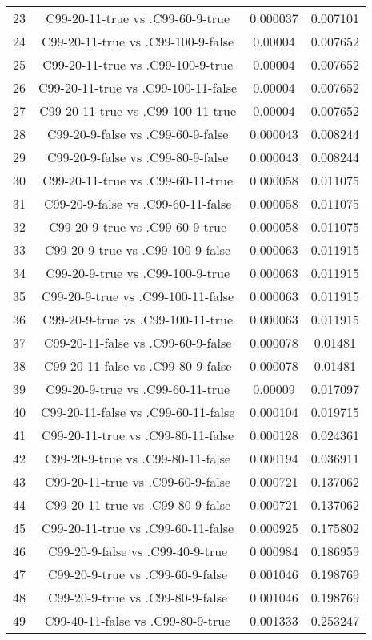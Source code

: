 \documentclass[a4paper,10pt]{article}
\begin{document}
\begin{landscape}
\begin{table}[!htp]
\begin{tabular}{cccc}
23&C99-20-11-true vs .C99-60-9-true&0.000037&0.007101\\
24&C99-20-11-true vs .C99-100-9-false&0.00004&0.007652\\
25&C99-20-11-true vs .C99-100-9-true&0.00004&0.007652\\
26&C99-20-11-true vs .C99-100-11-false&0.00004&0.007652\\
27&C99-20-11-true vs .C99-100-11-true&0.00004&0.007652\\
28&C99-20-9-false vs .C99-60-9-false&0.000043&0.008244\\
29&C99-20-9-false vs .C99-80-9-false&0.000043&0.008244\\
30&C99-20-11-true vs .C99-60-11-true&0.000058&0.011075\\
31&C99-20-9-false vs .C99-60-11-false&0.000058&0.011075\\
32&C99-20-9-true vs .C99-60-9-true&0.000058&0.011075\\
33&C99-20-9-true vs .C99-100-9-false&0.000063&0.011915\\
34&C99-20-9-true vs .C99-100-9-true&0.000063&0.011915\\
35&C99-20-9-true vs .C99-100-11-false&0.000063&0.011915\\
36&C99-20-9-true vs .C99-100-11-true&0.000063&0.011915\\
37&C99-20-11-false vs .C99-60-9-false&0.000078&0.01481\\
38&C99-20-11-false vs .C99-80-9-false&0.000078&0.01481\\
39&C99-20-9-true vs .C99-60-11-true&0.00009&0.017097\\
40&C99-20-11-false vs .C99-60-11-false&0.000104&0.019715\\
41&C99-20-11-true vs .C99-80-11-false&0.000128&0.024361\\
42&C99-20-9-true vs .C99-80-11-false&0.000194&0.036911\\
43&C99-20-11-true vs .C99-60-9-false&0.000721&0.137062\\
44&C99-20-11-true vs .C99-80-9-false&0.000721&0.137062\\
45&C99-20-11-true vs .C99-60-11-false&0.000925&0.175802\\
46&C99-20-9-false vs .C99-40-9-true&0.000984&0.186959\\
47&C99-20-9-true vs .C99-60-9-false&0.001046&0.198769\\
48&C99-20-9-true vs .C99-80-9-false&0.001046&0.198769\\
49&C99-40-11-false vs .C99-80-9-true&0.001333&0.253247\\

\end{tabular}
\end{table}
\end{landscape}
\end{document}
